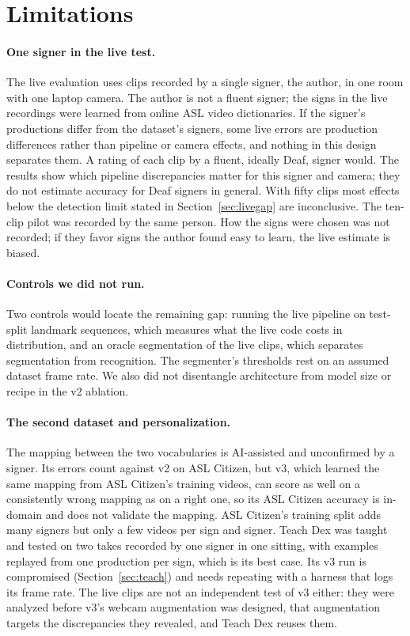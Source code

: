 \section*{Limitations}

\paragraph{One signer in the live test.} The live evaluation uses  clips recorded by a
single signer, the author, in one room with one laptop camera. The author is not a fluent signer;
the signs in the live recordings were learned from online ASL video dictionaries. If the signer's
productions differ from the dataset's signers, some live errors are
production differences rather than pipeline or camera effects, and nothing in this design
separates them. A rating of each clip by a fluent, ideally Deaf, signer would. The results show
which pipeline discrepancies matter for this signer and camera; they do not estimate accuracy for
Deaf signers in general. With fifty clips most effects below the detection limit stated in
Section~\ref{sec:livegap} are inconclusive. The ten-clip pilot was recorded by the same person.
How the  signs were chosen was not recorded; if they favor signs the author found
easy to learn, the live estimate is biased.

\paragraph{Controls we did not run.} Two controls would locate the remaining gap: running the live
pipeline on test-split landmark sequences, which measures what the live code costs in
distribution, and an oracle segmentation of the live clips, which separates segmentation from
recognition. The segmenter's thresholds rest on an assumed dataset frame rate. We also did not
disentangle architecture from model size or recipe in the v2 ablation.

\paragraph{The second dataset and personalization.} The mapping between the two vocabularies is
AI-assisted and unconfirmed by a signer. Its errors count against v2 on ASL Citizen, but v3, which
learned the same mapping from ASL Citizen's training videos, can score as well on a consistently
wrong mapping as on a right one, so its ASL Citizen accuracy is in-domain and does not validate
the mapping. ASL Citizen's training split adds many signers but only a few videos per sign and
signer. Teach Dex was taught and tested on two takes recorded by one signer in one sitting, with
examples replayed from one production per sign, which is its best case. Its v3 run is compromised
(Section~\ref{sec:teach}) and needs repeating with a harness that logs its frame rate. The live
clips are not an independent test of v3 either: they were analyzed before v3's webcam augmentation
was designed, that augmentation targets the discrepancies they revealed, and Teach Dex reuses them.

